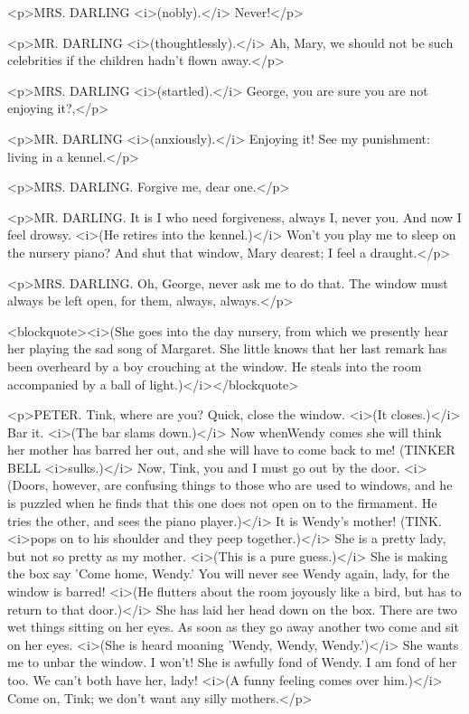 <p>MRS. DARLING <i>(nobly).</i> Never!</p>

<p>MR. DARLING <i>(thoughtlessly).</i> Ah, Mary, we should not be
such celebrities if the children hadn't flown away.</p>

<p>MRS. DARLING <i>(startled).</i> George, you are sure you are not
enjoying it?,</p>

<p>MR. DARLING <i>(anxiously).</i> Enjoying it! See my punishment:
living in a kennel.</p>

<p>MRS. DARLING. Forgive me, dear one.</p>

<p>MR. DARLING. It is I who need forgiveness, always I, never you.
And now I feel drowsy. <i>(He retires into the kennel.)</i> Won't you
play me to sleep on the nursery piano? And shut that window, Mary
dearest; I feel a draught.</p>

<p>MRS. DARLING. Oh, George, never ask me to do that. The window must
always be left open, for them, always, always.</p>

<blockquote><i>(She goes into the day nursery, from which we
presently hear her playing the sad song of Margaret. She little knows
that her last remark has been overheard by a boy crouching at the
window. He steals into the room accompanied by a ball of
light.)</i></blockquote>

<p>PETER. Tink, where are you? Quick, close the window. <i>(It
closes.)</i> Bar it. <i>(The bar slams down.)</i> Now whenWendy comes
she will think her mother has barred her out, and she will have to
come back to me! (TINKER BELL <i>sulks.)</i> Now, Tink, you and I
must go out by the door. <i>(Doors, however, are confusing things to
those who are used to windows, and he is puzzled when he finds that
this one does not open on to the firmament. He tries the other, and
sees the piano player.)</i> It is Wendy's mother! (TINK. <i>pops on
to his shoulder and they peep together.)</i> She is a pretty lady,
but not so pretty as my mother. <i>(This is a pure guess.)</i> She is
making the box say 'Come home, Wendy.' You will never see Wendy
again, lady, for the window is barred! <i>(He flutters about the room
joyously like a bird, but has to return to that door.)</i> She has
laid her head down on the box. There are two wet things sitting on
her eyes. As soon as they go away another two come and sit on her
eyes. <i>(She is heard moaning 'Wendy, Wendy, Wendy.')</i> She wants
me to unbar the window. I won't! She is awfully fond of Wendy. I am
fond of her too. We can't both have her, lady! <i>(A funny feeling
comes over him.)</i> Come on, Tink; we don't want any silly
mothers.</p>

